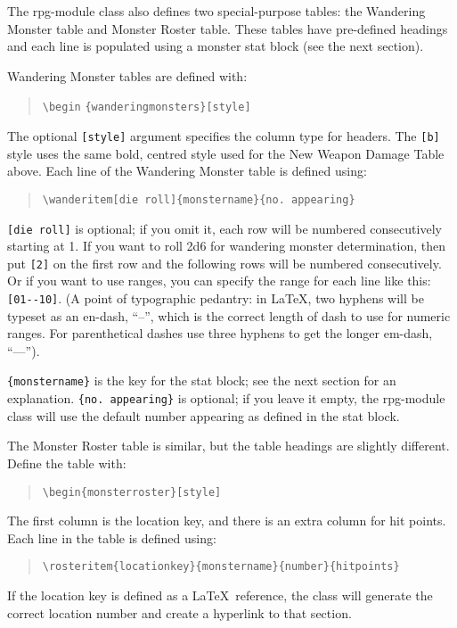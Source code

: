 \documentclass[a4paper,serif]{rpg-module}
\begin{document}
\vspace{1ex}\noindent The rpg-module class also defines two special-purpose tables: the Wandering Monster table and Monster Roster table. These tables
have pre-defined headings and each line is populated using a monster stat block (see the next section).

\noindent Wandering Monster tables are defined with:
\begin{quote}
\verb|\begin| \verb|{wanderingmonsters}[style]|
\end{quote}
The optional \verb|[style]| argument specifies the column type for headers. The \verb|[b]| style uses the same bold,
centred style used for the New Weapon Damage Table above. Each line of the Wandering Monster table is defined using:
\begin{quote}
\verb|\wanderitem[die roll]{monstername}{no. appearing}|
\end{quote}
\verb|[die roll]| is optional; if you omit it, each row will be numbered consecutively starting at 1. If you want to
roll 2d6 for wandering monster determination, then put \verb|[2]| on the first row and the following rows will be numbered
consecutively. Or if you want to use ranges, you can specify the range for each line like this: \verb|[01--10]|.
(A point of typographic pedantry: in \LaTeX, two hyphens will be typeset as an en-dash, ``--'', which is the correct length
of dash to use for numeric ranges. For parenthetical dashes use three hyphens to get the longer em-dash, ``---'').

\verb|{monstername}| is the key for the stat block; see the next section for an explanation.
\verb|{no. appearing}| is optional; if you leave it empty, the rpg-module class will use the default number appearing as defined in the stat block.

The Monster Roster table is similar, but the table headings are slightly different. Define the table with:
\begin{quote}
\verb|\begin{monsterroster}[style]|
\end{quote}
The first column is the location key, and there is an extra column for hit points. Each line in
the table is defined using:
\begin{quote}
\hspace{-2em}\verb|\rosteritem{locationkey}{monstername}{number}{hitpoints}|
\end{quote}
If the location key is defined as a \LaTeX~reference, the class will generate the correct location number and create a hyperlink to that section.
\end{document}
